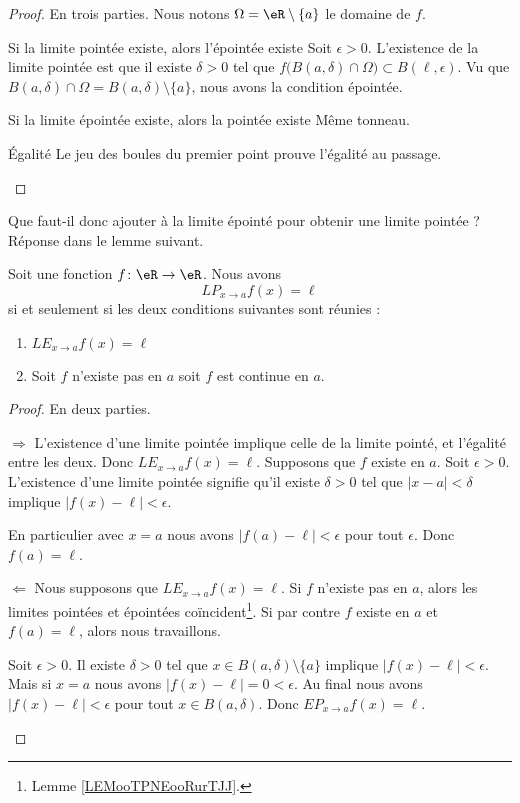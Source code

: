 \begin{proof}
	En trois parties. Nous notons \( \Omega=\eR\setminus\{ a \}\) le domaine de \( f\).
	\begin{subproof}
		\item[Si la limite pointée existe, alors l'épointée existe]
		Soit \( \epsilon>0\). L'existence de la limite pointée est que il existe \( \delta>0\) tel que \( f\big( B(a,\delta)\cap \Omega \big)\subset  B(\ell,\epsilon)\). Vu que \( B(a,\delta)\cap\Omega=B(a,\delta)\setminus\{ a \}\), nous avons la condition épointée.
		\item[Si la limite épointée existe, alors la pointée existe]
		Même tonneau.
		\item[Égalité]
		Le jeu des boules du premier point prouve l'égalité au passage.
	\end{subproof}
\end{proof}

Que faut-il donc ajouter à la limite épointé pour obtenir une limite pointée ? Réponse dans le lemme suivant.
\begin{lemma}
	Soit une fonction \( f\colon \eR\to \eR\). Nous avons
	\begin{equation}
		{LP}_{x\to a}f(x)=\ell
	\end{equation}
	si et seulement si les deux conditions suivantes sont réunies :
	\begin{enumerate}
		\item
		      \( {LE}_{x\to a}f(x)=\ell\)
		\item
		      Soit \( f\) n'existe pas en \( a\) soit \( f\) est continue en \( a\).
	\end{enumerate}
\end{lemma}

\begin{proof}
	En deux parties.
	\begin{subproof}
		\item[\( \Rightarrow\)]
		L'existence d'une limite pointée implique celle de la limite pointé, et l'égalité entre les deux. Donc \( {LE}_{x\to a}f(x)=\ell\). Supposons que \( f\) existe en \( a\). Soit \( \epsilon>0\). L'existence d'une limite pointée signifie qu'il existe \( \delta>0\) tel que \( | x-a |<\delta\) implique \( | f(x)-\ell |<\epsilon\).

		En particulier avec \( x=a\) nous avons \( | f(a)-\ell |<\epsilon\) pour tout \( \epsilon\). Donc \( f(a)=\ell\).
		\item[\( \Leftarrow\)]
		Nous supposons que \( {LE}_{x\to a}f(x)=\ell\). Si \( f\) n'existe pas en \( a\), alors les limites pointées et épointées coïncident\footnote{Lemme \ref{LEMooTPNEooRurTJJ}.}. Si par contre \( f\) existe en \( a\) et \( f(a)=\ell\), alors nous travaillons.

		Soit \( \epsilon>0\). Il existe \( \delta>0\) tel que \(  x\in B(a,\delta)\setminus \{ a \}  \) implique \( | f(x)-\ell |<\epsilon\). Mais si \( x=a\) nous avons \( | f(x)-\ell |=0<\epsilon\). Au final nous avons \( | f(x)-\ell |<\epsilon\) pour tout \( x\in B(a,\delta)\). Donc \( {EP}_{x\to a}f(x)=\ell\).
	\end{subproof}
\end{proof}

